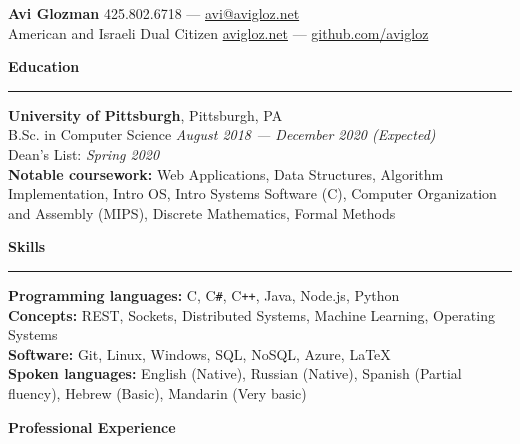 \documentclass[10pt]{article}
\begin{document}
	\pagestyle{empty}
	\begin{center}
		{\huge \textbf{Avi Glozman}} {\large \hfill 425.802.6718 --- \href{mailto:avi@avigloz.net}{avi@avigloz.net}}\\
		\vspace{1.25mm}
		{\large American and Israeli Dual Citizen \hfill \href{https://avigloz.net}{avigloz.net} --- \href{https://github.com/avigloz}{github.com/avigloz}}
	\end{center}
	
	\begin{flushleft}	
		\vspace{-1.65mm}
		{\large \raggedright \textbf{Education}}
		\vspace{1.25mm}
	
		\hrule
		
		\vspace{2.25mm}
		\textbf{University of Pittsburgh}, Pittsburgh, PA\\
      	{\small B.Sc. in Computer Science \hfill \textit{August 2018 --- December 2020 (Expected)}}\\
		{\small Dean's List: \textit{Spring 2020}}\\
		{\small \textbf{Notable coursework:} Web Applications, Data Structures, Algorithm Implementation, Intro OS, Intro Systems Software (C), Computer Organization and Assembly (MIPS), Discrete Mathematics, Formal Methods}
	
		\vspace{1.25mm} 
		{\large \raggedright \textbf{Skills}}
		\vspace{1.25mm}
	
		\hrule
	
		\vspace{2.25mm}
		\textbf{Programming languages:} C, C\verb!#!, C\texttt{++}, Java, Node.js, Python\\
		\vspace{0.5mm}
		\textbf{Concepts:} REST, Sockets, Distributed Systems, Machine Learning, Operating Systems\\
		\vspace{0.5mm}
		\textbf{Software:} Git, Linux, Windows, SQL, NoSQL, Azure, \LaTeX\\ 
		\vspace{0.5mm}
		\textbf{Spoken languages:} English (Native), Russian (Native), Spanish (Partial fluency),  Hebrew (Basic), Mandarin (Very basic)

		\vspace{1.5mm}
		{\large \raggedright \textbf{Professional Experience}}
		\vspace{1.25mm}
	

\end{flushleft}
\end{document}
